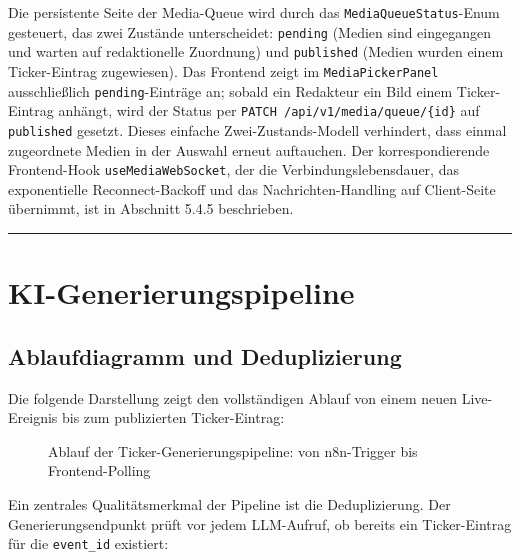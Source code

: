 Die persistente Seite der Media-Queue wird durch das
\texttt{MediaQueueStatus}-Enum gesteuert, das zwei Zustände
unterscheidet: \texttt{pending} (Medien sind eingegangen und warten auf
redaktionelle Zuordnung) und \texttt{published} (Medien wurden einem
Ticker-Eintrag zugewiesen). Das Frontend zeigt im
\texttt{MediaPickerPanel} ausschließlich \texttt{pending}-Einträge an;
sobald ein Redakteur ein Bild einem Ticker-Eintrag anhängt, wird der
Status per \texttt{PATCH\ /api/v1/media/queue/\{id\}} auf
\texttt{published} gesetzt. Dieses einfache Zwei-Zustands-Modell
verhindert, dass einmal zugeordnete Medien in der Auswahl erneut
auftauchen. Der korrespondierende Frontend-Hook
\texttt{useMediaWebSocket}, der die Verbindungslebensdauer, das
exponentielle Reconnect-Backoff und das Nachrichten-Handling auf
Client-Seite übernimmt, ist in Abschnitt 5.4.5 beschrieben.

\begin{center}\rule{0.5\linewidth}{0.5pt}\end{center}

\section{KI-Generierungspipeline}\label{ki-generierungspipeline}

\subsection{Ablaufdiagramm und Deduplizierung}\label{ablaufdiagramm}

Die folgende Darstellung zeigt den vollständigen Ablauf von einem neuen
Live-Ereignis bis zum publizierten Ticker-Eintrag:

\begin{figure}[H]
\centering
\DiagramTickerGenerationFlow
\caption{Ablauf der Ticker-Generierungspipeline: von n8n-Trigger bis Frontend-Polling}
\label{fig:tickergenerationflow}
\end{figure}

Ein zentrales Qualitätsmerkmal der Pipeline ist die Deduplizierung. Der
Generierungsendpunkt prüft vor jedem LLM-Aufruf, ob bereits ein
Ticker-Eintrag für die \texttt{event\_id} existiert:

\begin{Shaded}
\begin{Highlighting}[]
\OperatorTok{=}
\end{Highlighting}
\end{Shaded}

